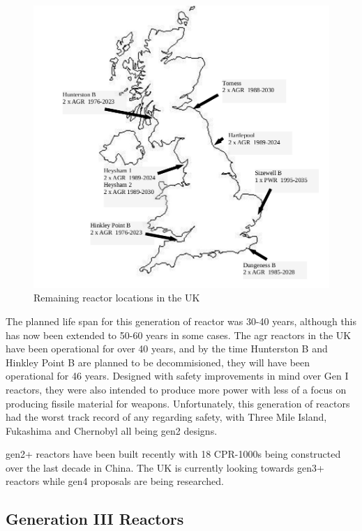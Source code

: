 \begin{figure}[tbp]
  \begin{center}
    \includegraphics[width=12.0cm]{chapters/introduction/images/remaining_plants.png}
    \caption{Remaining reactor locations in the UK}
    \label{fig:remainingreactorsuk}
  \end{center}
\end{figure}

The planned life span for this generation of reactor was 30-40 years, although this has now been extended to 50-60 years in some cases.  The \acrshort{agr} reactors in the UK have been operational for over 40 years, and by the time Hunterston B and Hinkley Point B are planned to be decommisioned, they will have been operational for 46 years.  Designed with safety improvements in mind over Gen I reactors, they were also intended to produce more power with less of a focus on producing fissile material for weapons.  Unfortunately, this generation of reactors had the worst track record of any regarding safety, with Three Mile Island, Fukashima and Chernobyl all being \acrshort{gen2} designs.

\acrshort{gen2+} reactors have been built recently with 18 CPR-1000s being constructed over the last decade in China.  The UK is currently looking towards \acrshort{gen3+} reactors while \acrshort{gen4} proposals are being researched.   


\subsection{Generation III Reactors}

